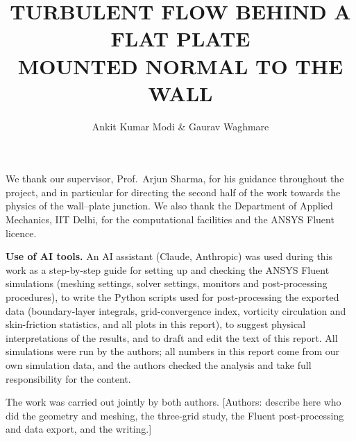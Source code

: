 \documentclass[12pt]{iitdamthes}
\begin{document}
\begin{frontmatter}

\title{TURBULENT FLOW BEHIND A FLAT PLATE\\ MOUNTED NORMAL TO THE WALL}
\author{Ankit Kumar Modi \& Gaurav Waghmare}
\btech
\endsem
\tablespagetrue
\maketitle

\studentdeclaration
\supervisorcertificate

\acknowledgements
We thank our supervisor, Prof.\ Arjun Sharma, for his guidance throughout the project, and in
particular for directing the second half of the work towards the physics of the wall--plate
junction. We also thank the Department of Applied Mechanics, IIT Delhi, for the computational
facilities and the ANSYS Fluent licence.

\noindent\textbf{Use of AI tools.} An AI assistant (Claude, Anthropic) was used during this work as a
step-by-step guide for setting up and checking the ANSYS Fluent simulations (meshing settings,
solver settings, monitors and post-processing procedures), to write the Python scripts used for
post-processing the exported data (boundary-layer integrals, grid-convergence index, vorticity
circulation and skin-friction statistics, and all plots in this report), to suggest physical
interpretations of the results, and to draft and edit the text of this report. All simulations were
run by the authors; all numbers in this report come from our own simulation data, and the authors
checked the analysis and take full responsibility for the content.

The work was carried out jointly by both authors. [Authors: describe here who did the geometry and
meshing, the three-grid study, the Fluent post-processing and data export, and the writing.]


\end{frontmatter}
\end{document}
